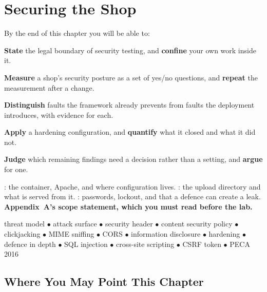 \chapter{Securing the Shop}\label{ch:security}

\begin{outcomes}
By the end of this chapter you will be able to:
\begin{tight}
  \item \textbf{State} the legal boundary of security testing, and
        \textbf{confine} your own work inside it.
  \item \textbf{Measure} a shop's security posture as a set of yes/no
        questions, and \textbf{repeat} the measurement after a change.
  \item \textbf{Distinguish} faults the framework already prevents from faults
        the deployment introduces, with evidence for each.
  \item \textbf{Apply} a hardening configuration, and \textbf{quantify} what it
        closed and what it did not.
  \item \textbf{Judge} which remaining findings need a decision rather than a
        setting, and \textbf{argue} for one.
\end{tight}
\end{outcomes}

\begin{prereq}
: the container, Apache, and where configuration lives.
: the upload directory and what is served from it.
: passwords, lockout, and that a defence can create a leak.
\textbf{Appendix~A's scope statement, which you must read before the lab.}
\end{prereq}

\begin{keyterms}
threat model $\bullet$ attack surface $\bullet$ security header $\bullet$
content security policy $\bullet$ clickjacking $\bullet$ MIME sniffing
$\bullet$ CORS $\bullet$ information disclosure $\bullet$ hardening $\bullet$
defence in depth $\bullet$ SQL injection $\bullet$ cross-site scripting
$\bullet$ CSRF token $\bullet$ PECA 2016
\end{keyterms}

\section{Where You May Point This Chapter}

